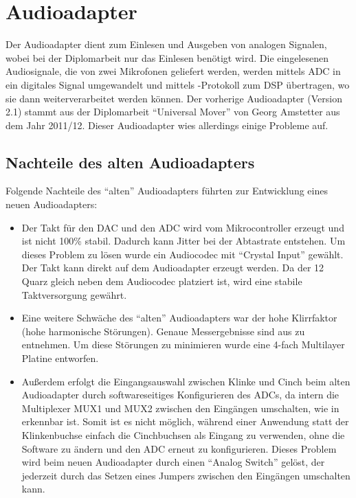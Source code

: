 \section{Audioadapter}
\label{sec:audioadapter}

Der Audioadapter dient zum Einlesen und Ausgeben von analogen Signalen, wobei bei der Diplomarbeit nur das Einlesen benötigt wird. Die eingelesenen Audiosignale, die von zwei Mikrofonen geliefert werden, werden mittels \gls{ADC} in ein digitales Signal umgewandelt und mittels \IIS{}-Protokoll zum \gls{DSP} übertragen, wo sie dann weiterverarbeitet werden können. Der vorherige Audioadapter (Version 2.1) stammt aus der Diplomarbeit \enquote{Universal Mover} von Georg Amstetter \cite{da:umover} aus dem Jahr 2011/12. Dieser Audioadapter wies allerdings einige Probleme auf.

\subsection{Nachteile des alten Audioadapters}
Folgende Nachteile des \enquote{alten} Audioadapters führten zur Entwicklung eines neuen Audioadapters:
\begin{itemize}
    \item Der Takt für den \gls{DAC} und den \gls{ADC} wird vom Mikrocontroller erzeugt und ist nicht 100\% stabil. Dadurch kann Jitter bei der Abtastrate entstehen. Um dieses Problem zu lösen wurde ein Audiocodec mit \enquote{Crystal Input} gewählt. Der Takt kann direkt auf dem Audioadapter erzeugt werden. Da der \unit{12}{\mega\hertz} Quarz gleich neben dem Audiocodec platziert ist, wird eine stabile Taktversorgung gewährt.
    \item Eine weitere Schwäche des \enquote{alten} Audioadapters war der hohe Klirrfaktor (hohe harmonische Störungen). Genaue Messergebnisse sind aus  zu entnehmen. Um diese Störungen zu minimieren wurde eine 4-fach Multilayer Platine entworfen.
    \item Außerdem erfolgt die Eingangsauswahl zwischen Klinke und Cinch beim alten Audioadapter durch softwareseitiges Konfigurieren des \gls{ADC}s, da intern die Multiplexer MUX1 und MUX2 zwischen den Eingängen umschalten, wie in  erkennbar ist. Somit ist es nicht möglich, während einer Anwendung statt der Klinkenbuchse einfach die Cinchbuchsen als Eingang zu verwenden, ohne die Software zu ändern und den \gls{ADC} erneut zu konfigurieren. Dieses Problem wird beim neuen Audioadapter durch einen \enquote{Analog Switch} gelöst, der jederzeit durch das Setzen eines Jumpers zwischen den Eingängen umschalten kann.
\end{itemize}

